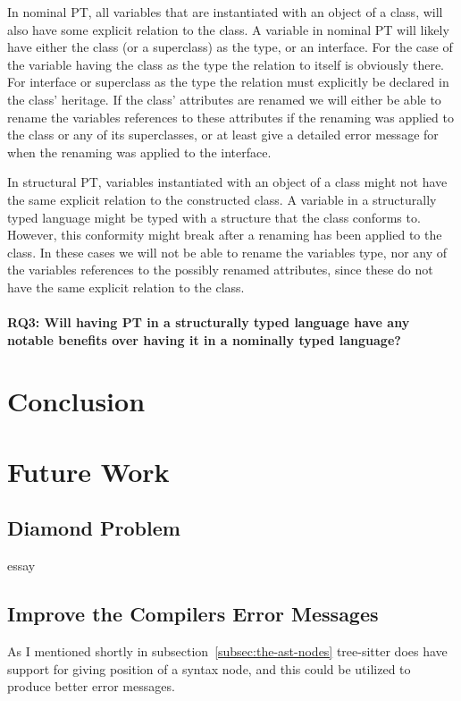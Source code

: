 In nominal PT, all variables that are instantiated with an object of a class, will also have some explicit relation to the class.
A variable in nominal PT will likely have either the class (or a superclass) as the type, or an interface.
For the case of the variable having the class as the type the relation to itself is obviously there.
For interface or superclass as the type the relation must explicitly be declared in the class' heritage.
If the class' attributes are renamed we will either be able to rename the variables references to these attributes if the renaming was applied to the class or any of its superclasses, or at least give a detailed error message for when the renaming was applied to the interface.

In structural PT, variables instantiated with an object of a class might not have the same explicit relation to the constructed class.
A variable in a structurally typed language might be typed with a structure that the class conforms to.
However, this conformity might break after a renaming has been applied to the class.
In these cases we will not be able to rename the variables type, nor any of the variables references to the possibly renamed attributes, since these do not have the same explicit relation to the class.

\paragraph{RQ3: Will having PT in a structurally typed language have any notable benefits over having it in a nominally typed language?}


\section{Conclusion}\label{sec:result-conclusion}


\section{Future Work}\label{sec:future-work}

\subsection{Diamond Problem}\label{subsec:diamond-problem}

essay

\subsection{Improve the Compilers Error Messages}\label{subsec:compiler-with-focus-on-error-messages}

As I mentioned shortly in subsection~\vref{subsec:the-ast-nodes} tree-sitter does have support for giving position of a syntax node, and this could be utilized to produce better error messages.
